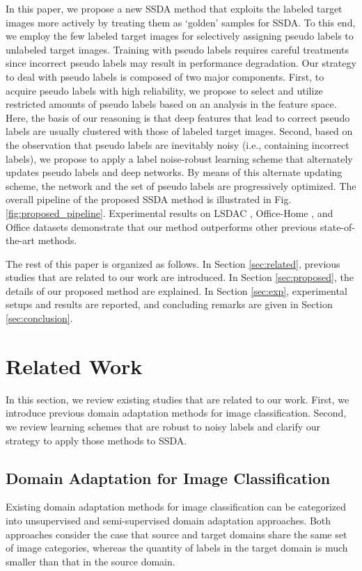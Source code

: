 \documentclass[a4paper,conference]{IEEEtran}
\begin{document}
In this paper, we propose a new SSDA method that exploits the labeled target images more actively by treating them as ‘golden’ samples for SSDA. To this end, we employ the few labeled target images for selectively assigning pseudo labels to unlabeled target images. Training with pseudo labels \cite{lee2013pseudo} requires careful treatments since incorrect pseudo labels may result in performance degradation. Our strategy to deal with pseudo labels is composed of two major components. First, to acquire pseudo labels with high reliability, we propose to select and utilize restricted amounts of pseudo labels based on an analysis in the feature space. Here, the basis of our reasoning is that deep features that lead to correct pseudo labels are usually clustered with those of labeled target images. Second, based on the observation that pseudo labels are inevitably noisy (i.e., containing incorrect labels), we propose to apply a label noise-robust learning scheme \cite{tanaka2018joint} that alternately updates pseudo labels and deep networks. By means of this alternate updating scheme, the network and the set of pseudo labels are progressively optimized. The overall pipeline of the proposed SSDA method is illustrated in Fig. \ref{fig:proposed_pipeline}. \color{black} Experimental results on LSDAC \cite{peng2019moment}, Office-Home \cite{venkateswara2017deep}, and Office \cite{saenko2010adapting} datasets demonstrate that our method outperforms other previous state-of-the-art methods.

The rest of this paper is organized as follows. In Section \ref{sec:related}, previous studies that are related to our work are introduced. In Section \ref{sec:proposed}, the details of our proposed method are explained. In Section \ref{sec:exp}, experimental setups and results are reported, and concluding remarks are given in Section \ref{sec:conclusion}.





\section{Related Work}
In this section, we review existing studies that are related to our work. First, we introduce previous domain adaptation methods for image classification. Second, we review learning schemes that are robust to noisy labels and clarify our strategy to apply those methods to SSDA.



\label{sec:related}
\subsection{Domain Adaptation for Image Classification}
Existing domain adaptation methods for image classification can be categorized into unsupervised and semi-supervised domain adaptation approaches. Both approaches consider the case that source and target domains share the same set of image categories, whereas the quantity of labels in the target domain is much smaller than that in the source domain.
\end{document}
